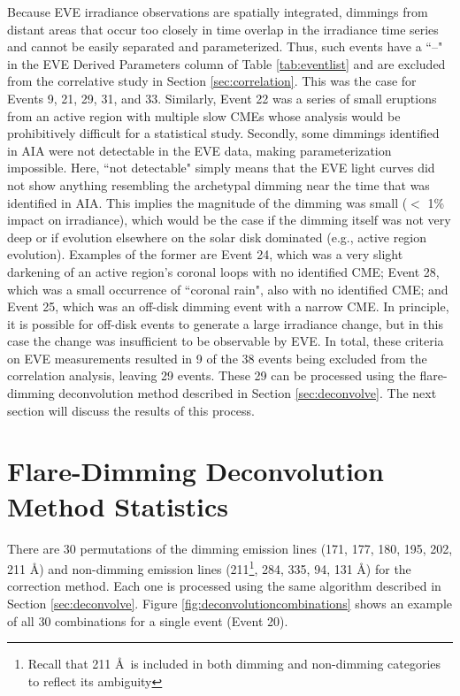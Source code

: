 Because EVE irradiance observations are spatially integrated, dimmings from distant areas that occur too closely in time overlap in the irradiance time series and cannot be easily separated and parameterized. Thus, such events have a ``--" in the EVE Derived Parameters column of Table \ref{tab:eventlist} and are excluded from the correlative study in Section \ref{sec:correlation}. This was the case for Events 9, 21, 29, 31, and 33. Similarly, Event 22 was a series of small eruptions from an active region with multiple slow CMEs whose analysis would be prohibitively difficult for a statistical study. Secondly, some dimmings identified in AIA were not detectable in the EVE data, making parameterization impossible. Here, ``not detectable" simply means that the EVE light curves did not show anything resembling the archetypal dimming near the time that was identified in AIA. This implies the magnitude of the dimming was small ($<$ 1\% impact on irradiance), which would be the case if the dimming itself was not very deep or if evolution elsewhere on the solar disk dominated (e.g., active region evolution). Examples of the former are Event 24, which was a very slight darkening of an active region’s coronal loops with no identified CME; Event 28, which was a small occurrence of ``coronal rain", also with no identified CME; and Event 25, which was an off-disk dimming event with a narrow CME. In principle, it is possible for off-disk events to generate a large irradiance change, but in this case the change was insufficient to be observable by EVE. In total, these criteria on EVE measurements resulted in 9 of the 38 events being excluded from the correlation analysis, leaving 29 events. These 29 can be processed using the flare-dimming deconvolution method described in Section \ref{sec:deconvolve}. The next section will discuss the results of this process. 

\section{Flare-Dimming Deconvolution Method Statistics}
\label{sec:deconvolutionstatistics}
There are 30 permutations of the dimming emission lines (171, 177, 180, 195, 202, 211 \AA) and non-dimming emission lines (211\footnote{Recall that 211 \AA\ is included in both dimming and non-dimming categories to reflect its ambiguity}, 284, 335, 94, 131 \AA) for the correction method. Each one is processed using the same algorithm described in Section \ref{sec:deconvolve}. Figure \ref{fig:deconvolutioncombinations} shows an example of all 30 combinations for a single event (Event 20). 

